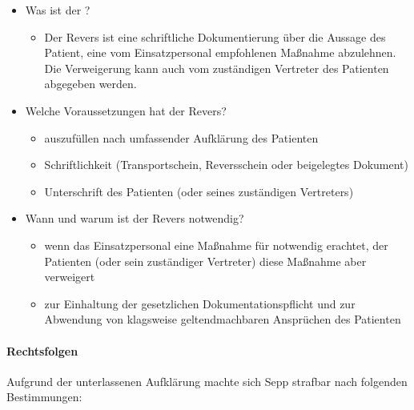 \begin{itemize}
	\item Was ist der ?
	\begin{itemize}
	\item {\mdseries
	Der Revers ist eine schriftliche Dokumentierung \"uber die Aussage des
	Patient, eine vom Einsatz\-personal empfohlenen Ma{\ss}nahme
	abzulehnen. Die Verweigerung kann auch vom zuständigen Vertreter des
	Patienten abgegeben werden.}
	\end{itemize}	
\end{itemize}
\begin{itemize}
	\item Welche Voraussetzungen hat der Revers?
	\begin{itemize}
		\item auszuf\"ullen nach umfassender Aufklärung des Patienten
		\item Schriftlichkeit (Transportschein, Reversschein oder beigelegtes
		Dokument)
		\item Unterschrift des Patienten (oder seines zuständigen Vertreters)
	\end{itemize}
\end{itemize}
\begin{itemize}
	\item Wann und warum ist der Revers notwendig?
	\begin{itemize}
		\item {\mdseries
		 wenn das Einsatzpersonal eine Ma{\ss}nahme f\"ur notwendig erachtet,
		der Patienten  (oder sein zuständiger Vertreter) diese Ma{\ss}nahme
		aber verweigert}
		\item zur Einhaltung der gesetzlichen Dokumentationspflicht und zur Abwendung
		von  klagsweise geltendmachbaren Anspr\"uchen des Patienten
	\end{itemize}
\end{itemize}


\paragraph*{Rechtsfolgen}

Aufgrund der unterlassenen Aufklärung machte sich Sepp strafbar nach
folgenden Bestimmungen:

